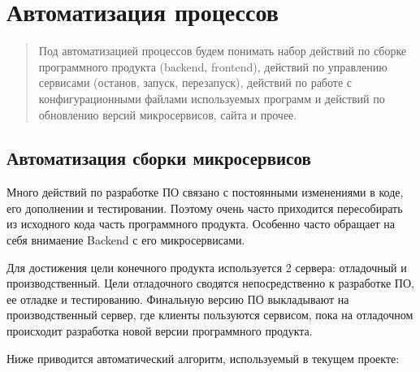 \section{Автоматизация процессов}

\begin{quote}
\sffamily Под автоматизацией процессов будем понимать набор действий по сборке программного продукта (backend, frontend), действий по управлению  сервисами (останов, запуск, перезапуск), действий по работе с конфигурационными файлами используемых программ и действий по обновлению версий микросервисов, сайта и прочее.
\end{quote}


\subsection{Автоматизация сборки микросервисов}

Много действий по разработке ПО связано с постоянными изменениями в коде, его дополнении и тестировании. Поэтому очень часто приходится пересобирать из исходного кода часть программного продукта. Особенно часто обращает на себя внимаение Backend с его микросервисами. 

Для достижения цели конечного продукта используется 2 сервера: отладочный и производственный. Цели отладочного сводятся непосредственно к разработке ПО, ее отладке и тестированию. Финальную версию ПО выкладывают на производственный сервер, где клиенты пользуются сервисом, пока на отладочном происходит разработка новой версии программного продукта.

Ниже приводится автоматический алгоритм, используемый в текущем проекте:


